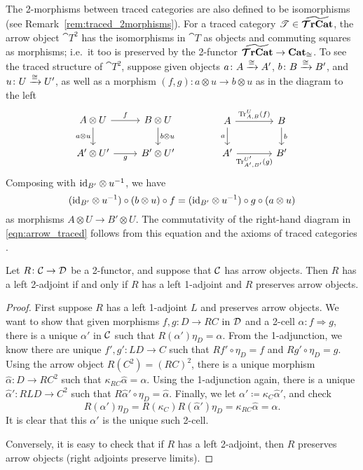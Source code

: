 \documentclass[11pt,oneside,article]{memoir}
\begin{document}
\begin{example}
  The 2-morphisms between traced categories are also defined to be isomorphisms (see
  Remark~\ref{rem:traced_2morphisms}). For a traced category $\mathscr{T}\in\widetilde{\bm{\mathcal{T}}\mathbf{rCat}}$, the arrow
  object $\cat{T}^2$ has the isomorphisms in $\cat{T}$ as objects and commuting squares as
  morphisms; i.e.\ it too is preserved by the 2-functor $\widetilde{\bm{\mathcal{T}}\mathbf{rCat}}\to\mathbf{Cat}_{\cong}$. To see the
  traced structure of $\cat{T}^2$, suppose given objects $a\colon A\xrightarrow{\cong} A'$, $b\colon
  B\xrightarrow{\cong} B'$, and $u\colon U\xrightarrow{\cong} U'$, as well as a morphism $(f,g)\colon a\otimes u\to
  b\otimes u$ as in the diagram to the left
  \begin{equation}
      \label{eqn:arrow_traced}
    \begin{tikzcd}
      A\otimes U\ar[d,"a\otimes u"']\ar[r,"f"]&B\otimes U\ar[d,"b\otimes u"]\\
      A'\otimes U'\ar[r,"g"']&B'\otimes U'
    \end{tikzcd}
    \qquad\qquad
    \begin{tikzcd}[column sep=large]
      A\ar[d,"a"']\ar[r,"\Tr^U_{A,B}(f)"]&B\ar[d,"b"]\\
      A'\ar[r,"\Tr^{U'}_{A',B'}(g)"']&B'
    \end{tikzcd}
  \end{equation}
  Composing with $\mathrm{id}_{B'}\otimes u^{-1}$, we have
  \[
    (\mathrm{id}_{B'}\otimes u^{-1})\circ(b\otimes u)\circ f
        =(\mathrm{id}_{B'}\otimes u^{-1})\circ g\circ(a\otimes u)
  \]
  as morphisms $A\otimes U\to B'\otimes U$. The commutativity of the right-hand diagram in
  \eqref{eqn:arrow_traced} follows from this equation and the axioms of traced categories
  \cite{JoyalStreetVerity}.
\end{example}

\begin{lemma}
    \label{lem:2_adjunction}
  Let $R\colon\mathcal{C}\to\mathcal{D}$ be a 2-functor, and suppose that $\mathcal{C}$ has arrow objects.
  Then $R$ has a left 2-adjoint if and only if $R$ has a left 1-adjoint and $R$ preserves arrow
  objects.
\end{lemma}
\begin{proof}
  First suppose $R$ has a left 1-adjoint $L$ and preserves arrow objects. We want to show that given
  morphisms $f,g\colon D\to RC$ in $\mathcal{D}$ and a 2-cell $\alpha\colon f\Rightarrow g$, there is a
  unique $\alpha'$ in $\mathcal{C}$ such that $R(\alpha')\eta_D=\alpha$. From the 1-adjunction, we know
  there are unique $f',g'\colon LD\to C$ such that $Rf'\circ\eta_D=f$ and $Rg'\circ\eta_D=g$. Using
  the arrow object $R(C^2)=(RC)^2$, there is a unique morphism $\hat{\alpha}\colon D\to RC^2$ such
  that $\kappa_{RC}\hat{\alpha}=\alpha$. Using the 1-adjunction again, there is a unique
  $\hat{\alpha}'\colon RLD\to C^2$ such that $R\hat{\alpha}'\circ\eta_D=\hat{\alpha}$. Finally, we
  let $\alpha'\coloneqq\kappa_C\hat{\alpha}'$, and check
  \[
    R(\alpha')\eta_D = R(\kappa_C)R(\hat{\alpha}')\eta_D = \kappa_{RC}\hat{\alpha} = \alpha.
  \]
  It is clear that this $\alpha'$ is the unique such 2-cell.

  Conversely, it is easy to check that if $R$ has a left 2-adjoint, then $R$ preserves arrow objects
  (right adjoints preserve limits).
\end{proof}
\end{document}
